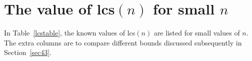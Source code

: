 \documentclass[12pt]{report}
\newtheorem{lemma}{Lemma}
\newtheorem{preproof}{{\bf Proof.}}
\newenvironment{proof}[1]{\begin{preproof}{\rm
               #1}\hfill{\rule[-0.5mm]{2mm}{2mm}}}{\end{preproof}}
\def\lcs#1{{\rm lcs}$(#1)$}
\begin{document}
%
%
\section{The value of \lcs{n}  for small $n$}      %
In Table~\ref{lcstable}, the known values of \lcs{n} are listed for small
values of $n$.  The extra columns are to compare different bounds
discussed subsequently in Section~\ref{sec43}.
\end{document}
